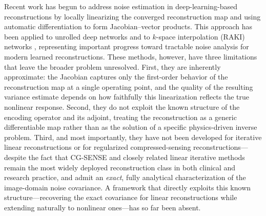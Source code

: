 \documentclass[AMA,STIX2COL,Linenumberson]{MRM}
\begin{document}
Recent work has begun to address noise estimation in 
deep-learning-based reconstructions by locally linearizing 
the converged reconstruction map and using automatic 
differentiation to form Jacobian--vector products. This 
approach has been applied to unrolled deep networks 
\cite{dalmaz2025efficient} and to $k$-space interpolation 
(RAKI) networks \cite{Dawood2024,homolya2025raki}, 
representing important progress toward tractable noise 
analysis for modern learned reconstructions. These methods, 
however, have three limitations that leave the broader 
problem unresolved. First, they are inherently approximate: 
the Jacobian captures only the first-order behavior of the 
reconstruction map at a single operating point, and the 
quality of the resulting variance estimate depends on how 
faithfully this linearization reflects the true nonlinear 
response. Second, they do not exploit the known structure of 
the encoding operator and its adjoint, treating the 
reconstruction as a generic differentiable map rather than 
as the solution of a specific physics-driven inverse problem. 
Third, and most importantly, they have not been developed 
for iterative linear reconstructions or for regularized 
compressed-sensing reconstructions---despite the fact that 
CG-SENSE and closely related linear iterative methods remain 
the most widely deployed reconstruction class in both 
clinical and research practice, and admit an \emph{exact}, 
fully analytical characterization of the image-domain noise 
covariance. A framework that 
directly exploits this known structure---recovering the 
exact covariance for linear reconstructions while extending 
naturally to nonlinear ones---has so far been absent.
 
\end{document}
